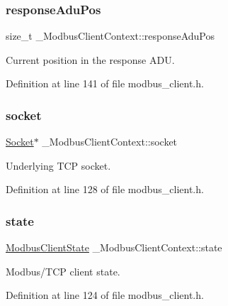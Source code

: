 \subsubsection{\texorpdfstring{response\+Adu\+Pos}{responseAduPos}}
{\footnotesize\ttfamily size\+\_\+t \+\_\+\+Modbus\+Client\+Context\+::response\+Adu\+Pos}



Current position in the response A\+DU. 



Definition at line 141 of file modbus\+\_\+client.\+h.

\mbox{\label{struct__ModbusClientContext_a80437706d8e54d0d668713d226b0b0c7}} 
\subsubsection{\texorpdfstring{socket}{socket}}
{\footnotesize\ttfamily \hyperlink{socket_8h_aa85acfb0fa336ef495e6ba87fb88fc48}{Socket}$\ast$ \+\_\+\+Modbus\+Client\+Context\+::socket}



Underlying T\+CP socket. 



Definition at line 128 of file modbus\+\_\+client.\+h.

\mbox{\label{struct__ModbusClientContext_aec9ee7f031803363d2972d4bd405ad7f}} 
\subsubsection{\texorpdfstring{state}{state}}
{\footnotesize\ttfamily \hyperlink{modbus__client_8h_af9e4aa6eb4ddde054d9f23f72b3fb3fd}{Modbus\+Client\+State} \+\_\+\+Modbus\+Client\+Context\+::state}



Modbus/\+T\+CP client state. 



Definition at line 124 of file modbus\+\_\+client.\+h.

\mbox{\label{struct__ModbusClientContext_a5b0a7d5bcfb0f43f5f177a0e6ae56282}} 
